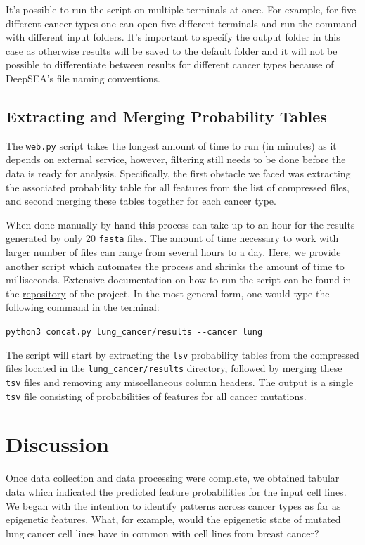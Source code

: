 \documentclass{article}
\begin{document}
It's possible to run the script on multiple terminals at once. For example, for five different cancer types one can open five different terminals and run the command with different input folders. It's important to specify the output folder in this case as otherwise results will be saved to the default folder and it will not be possible to differentiate between results for different cancer types because of DeepSEA's file naming conventions.

\subsection{Extracting and Merging Probability Tables}
The \texttt{web.py} script takes the longest amount of time to run (in minutes) as it depends on external service, however, filtering still needs to be done before the data is ready for analysis. Specifically, the first obstacle we faced was extracting the associated probability table for all features from the list of compressed files, and second merging these tables together for each cancer type. 

When done manually by hand this process can take up to an hour for the results generated by only 20 \texttt{fasta} files. The amount of time necessary to work with larger number of files can range from several hours to a day. Here, we provide another script which automates the process and shrinks the amount of time to milliseconds. Extensive documentation on how to run the script can be found in the \href{https://github.com/sme777/seaWAS/blob/master/README.md}{repository} of the project. In the most general form, one would type the following command in the terminal:
\begin{center}
\texttt{python3 concat.py lung\_cancer/results -{}-cancer lung}
\end{center}
The script will start by extracting the \texttt{tsv} probability tables from the compressed files located in the \texttt{lung\_cancer/results} directory, followed by merging these \texttt{tsv} files and removing any miscellaneous column headers. The output is a single \texttt{tsv} file consisting of probabilities of features for all cancer mutations.
\section{Discussion}
Once data collection and data processing were complete, we obtained tabular data which indicated the predicted feature probabilities for the input cell lines. We began with the intention to identify patterns across cancer types as far as epigenetic features. What, for example, would the epigenetic state of mutated lung cancer cell lines have in common with cell lines from breast cancer? 
\end{document}
